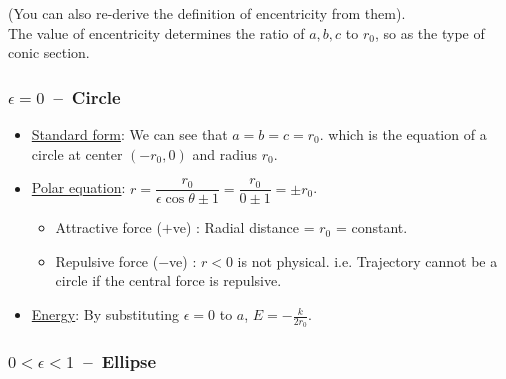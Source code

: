 \documentclass[class=article, crop=false, 12pt]{standalone}
\begin{document}

(You can also re-derive the definition of encentricity from them).\\

The value of encentricity determines the ratio of $a,b,c$ to $r_0$, 
so as the type of conic section. 

\subsubsection{$\epsilon = 0$ \,--\, Circle}

\begin{itemize}
       
    \item \ul{Standard form}: We can see that $a=b=c=r_0$. 
    which is the equation of a circle at center $(-r_0,0)$ and radius $r_0$.

    \item \ul{Polar equation}: $r=\dfrac{r_0}{\epsilon\cos\theta \pm 1} = \dfrac{r_0}{0 \pm 1} = \pm r_0$. 
    \begin{itemize}
        \item Attractive force ($+$ve) : Radial distance = $r_0$ = constant.
        \item Repulsive force ($-$ve) : $r<0$ is not physical. 
        i.e. Trajectory cannot be a circle if the central force is repulsive.
    \end{itemize}
    
    \item \ul{Energy}: By substituting $\epsilon=0$ to $a$, $\boxed{E=-\frac{k}{2r_0}}$.

\end{itemize}


\subsubsection{$0<\epsilon <1$ \,--\, Ellipse}
\end{document}
